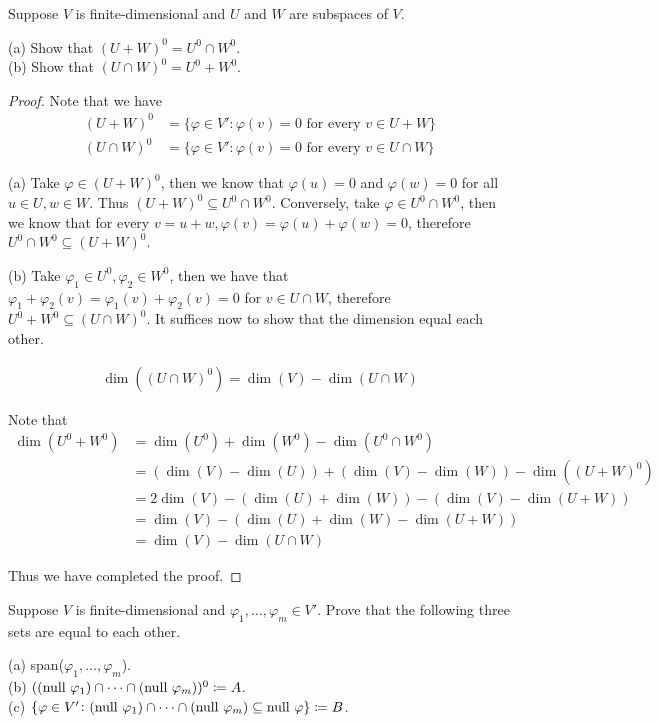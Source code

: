 \documentclass{extarticle}
\begin{document}
\begin{problem}{22}
    Suppose \(V\) is finite-dimensional and \(U\) and \(W\) are subspaces of \(V\). 

    (a) Show that \((U + W)^0 = U^0 \cap W^0\). \\ 
    (b) Show that \((U \cap W)^0 = U^0 + W^0.\)
\end{problem}

\begin{proof}
Note that we have 
\begin{align*}
    (U + W)^0&= \{\varphi \in V' \colon \varphi(v) = 0 \text{ for every } v \in U+W\} \\ 
    (U \cap W)^0 &= \{\varphi \in V' \colon \varphi(v) = 0 \text{ for every } v \in U \cap W\}
\end{align*}

(a) Take \(\varphi \in (U+W)^0\), then we know that \(\varphi(u) = 0\) and \(\varphi(w) = 0\)
for all \(u \in U, w \in W\). Thus \((U+W)^0 \subseteq U^0 \cap W^0\). Conversely, take 
\(\varphi \in U^0 \cap W^0\), then we know that for every \(v = u + w, \varphi(v)
= \varphi(u) + \varphi(w) = 0\), therefore \(U^0 \cap W^0 \subseteq (U+W)^0\). 

(b) Take \(\varphi_1 \in U^0, \varphi_2 \in W^0\), then we have that 
\(\varphi_1 + \varphi_2 (v) = \varphi_1(v) + \varphi_2(v) = 0\) for \(v \in U \cap W\), therefore 
\(U^0 + W^0 \subseteq (U \cap W)^0\). It suffices now to show that the dimension equal each other.

\begin{align*}
    \dim ((U\cap W)^0) = \dim (V) - \dim (U \cap W)
\end{align*}

Note that 
\begin{align*}
    \dim (U^0 + W^0)
    &=\dim(U^0) + \dim (W^0) - \dim (U^0 \cap W^0) \\ 
    &= (\dim(V) - \dim(U)) + (\dim(V) - \dim(W)) - \dim ((U+W)^0) \\ 
    &= 2 \dim(V) - (\dim(U) + \dim(W)) - (\dim(V) - \dim(U+W)) \\ 
    &= \dim(V) - (\dim(U) + \dim(W) - \dim(U+W)) \\ 
    &=\dim(V) - \dim(U \cap W)
\end{align*}

Thus we have completed the proof. 
\end{proof}

\begin{problem}{23}
    Suppose \(V\) is finite-dimensional and \(\varphi_1, \ldots, \varphi_m \in V'\). Prove 
    that the following three sets are equal to each other.

    (a) span(\(\varphi_1, \ldots, \varphi_m\)). \\ 
    (b) \(((\text{null } \varphi_1) \cap \cdots \cap (\text{null } \varphi_m))^0 \coloneq A\). \\ 
    (c) \(\{\varphi \in V' \colon (\text{null } \varphi_1) \cap \cdots \cap (\text{null } \varphi_m) \subseteq \text{null } \varphi\}
    \coloneq B\).
\end{problem}
\end{document}
